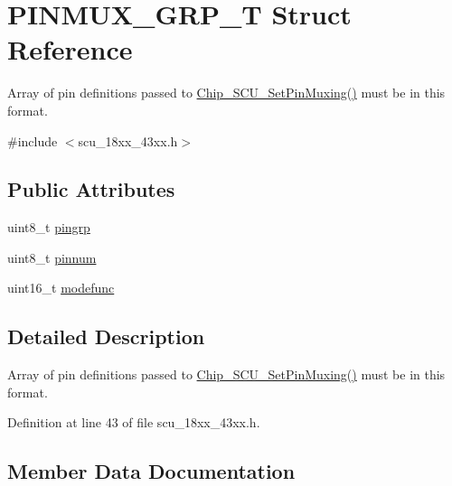 \hypertarget{struct_p_i_n_m_u_x___g_r_p___t}{}\section{P\+I\+N\+M\+U\+X\+\_\+\+G\+R\+P\+\_\+T Struct Reference}
\label{struct_p_i_n_m_u_x___g_r_p___t}


Array of pin definitions passed to \hyperlink{group___s_c_u__18_x_x__43_x_x_ga118ccc4ab5b115c5e8c7ce457eb85536}{Chip\+\_\+\+S\+C\+U\+\_\+\+Set\+Pin\+Muxing()} must be in this format.  




{\ttfamily \#include $<$scu\+\_\+18xx\+\_\+43xx.\+h$>$}

\subsection*{Public Attributes}
\begin{DoxyCompactItemize}
\item 
uint8\+\_\+t \hyperlink{struct_p_i_n_m_u_x___g_r_p___t_affc1f31b35c2ebc6f7e9b6a4516eef80}{pingrp}
\item 
uint8\+\_\+t \hyperlink{struct_p_i_n_m_u_x___g_r_p___t_aba96fd28e625bd7e35b45c45131a337b}{pinnum}
\item 
uint16\+\_\+t \hyperlink{struct_p_i_n_m_u_x___g_r_p___t_ac540bfb51c620a50c55472617c89dcf4}{modefunc}
\end{DoxyCompactItemize}


\subsection{Detailed Description}
Array of pin definitions passed to \hyperlink{group___s_c_u__18_x_x__43_x_x_ga118ccc4ab5b115c5e8c7ce457eb85536}{Chip\+\_\+\+S\+C\+U\+\_\+\+Set\+Pin\+Muxing()} must be in this format. 

Definition at line 43 of file scu\+\_\+18xx\+\_\+43xx.\+h.



\subsection{Member Data Documentation}
\mbox{\label{struct_p_i_n_m_u_x___g_r_p___t_ac540bfb51c620a50c55472617c89dcf4}} 
